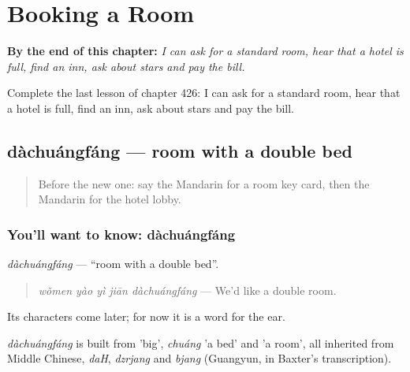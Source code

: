 
\chapter{Booking a Room}
\label{ch:zh-booking-a-room}

\begin{chapteropening}
\textbf{By the end of this chapter:} \emph{I can ask for a standard room, hear that a hotel is full, find an inn, ask about stars and pay the bill.}

Complete the last lesson of chapter 426: I can ask for a standard room, hear that a hotel is full, find an inn, ask about stars and pay the bill.
\end{chapteropening}

\section[dàchuángfáng]{dàchuángfáng — room with a double bed}

\label{lesson:ZH-C426-dachuangfang}



\begin{quote}
Before the new one: say the Mandarin for a room key card, then the Mandarin for the hotel lobby.
\end{quote}

\subsection*{You'll want to know: dàchuángfáng}
\emph{dàchuángfáng} — \textquotedblleft{}room with a double bed\textquotedblright{}.

\begin{quote}
\emph{wǒmen yào yì jiān dàchuángfáng} — We'd like a double room.
\end{quote}

Its characters come later; for now it is a word for the ear.

\begin{cousinweb}
\emph{dàchuángfáng} is built from  'big', \emph{chuáng} 'a bed' and  'a room', all inherited from Middle Chinese, \emph{daH}, \emph{dzrjang} and \emph{bjang} (Guangyun, in Baxter's transcription).
\end{cousinweb}

